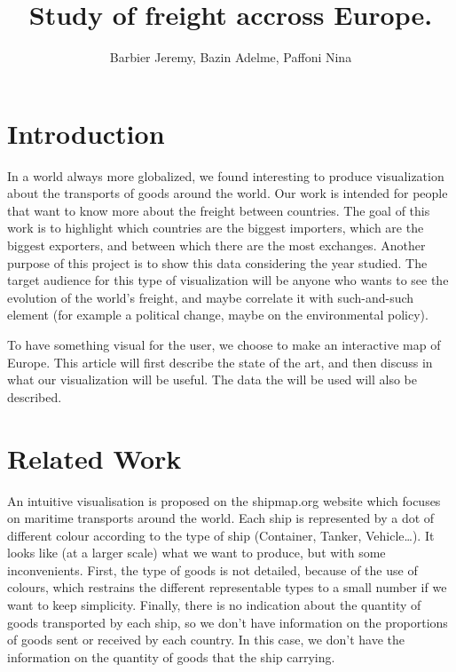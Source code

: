 \documentclass{vgtc}
\title{Study of freight accross Europe.}
\author{Barbier Jeremy, Bazin Adelme, Paffoni Nina}
\begin{document}
\maketitle

\section{Introduction}
In a world always more globalized, we found interesting to produce visualization about the transports of goods around the world. Our work is intended for people that want to know more about the freight between countries. The goal of this work is to highlight which countries are the biggest importers, which are the biggest exporters, and between which there are the most exchanges. 
Another purpose of this project is to show this data considering the year studied. The target audience for this type of visualization will be anyone who wants to see the evolution of the world’s freight, and maybe correlate it with such-and-such element (for example a political change, maybe on the environmental policy). 

To have something visual for the user, we choose to make an interactive map of Europe. This article will first describe the state of the art, and then discuss in what our visualization will be useful. The data the will be used will also be described. 

\section{Related Work}
An intuitive visualisation is proposed on the shipmap.org website \cite{shipmap} which focuses on maritime transports around the world. Each ship is represented by a dot of different colour according to the type of ship (Container, Tanker, Vehicle…). It looks like (at a larger scale) what we want to produce, but with some inconvenients. First, the type of goods is not detailed, because of the use of colours, which restrains the different representable types to a small number if we want to keep simplicity. Finally, there is no indication about the quantity of goods transported by each ship, so we don’t have information on the proportions of goods sent or received by each country. In this case, we don’t have the information on the quantity of goods that the ship carrying.
\end{document}
